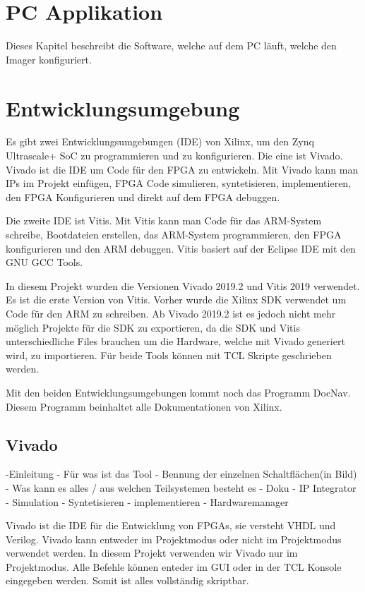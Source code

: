 \documentclass{article}
\begin{document}
\section{PC Applikation}
Dieses Kapitel beschreibt die Software, welche auf dem PC läuft, welche den Imager konfiguriert.

\section{Entwicklungsumgebung}
Es gibt zwei Entwicklungsumgebungen (IDE) von Xilinx, um den Zynq Ultrascale+ SoC zu programmieren und zu konfigurieren. Die eine ist Vivado. Vivado ist die IDE um Code für den FPGA zu entwickeln. Mit Vivado kann man IPs im Projekt einfügen, FPGA Code simulieren, syntetisieren, implementieren, den FPGA Konfigurieren und direkt auf dem FPGA debuggen.

Die zweite IDE ist Vitis. Mit Vitis kann man Code für das ARM-System schreibe, Bootdateien erstellen, das ARM-System programmieren, den FPGA konfigurieren und den ARM debuggen. Vitis basiert auf der Eclipse IDE mit den GNU GCC Tools.

In diesem Projekt wurden die Versionen Vivado 2019.2 und Vitis 2019 verwendet. Es ist die erste Version von Vitis. Vorher wurde die Xilinx SDK verwendet um Code für den ARM zu schreiben. Ab Vivado 2019.2 ist es jedoch nicht mehr möglich Projekte für die SDK zu exportieren, da die SDK und Vitis unterschiedliche Files brauchen um die Hardware, welche mit Vivado generiert wird, zu importieren. Für beide Tools können mit TCL Skripte geschrieben werden.

Mit den beiden Entwicklungsumgebungen kommt noch das Programm DocNav. Diesem Programm beinhaltet alle Dokumentationen von Xilinx.
\subsection{Vivado}
-Einleitung
    - Für was ist das Tool
    - Bennung der einzelnen Schaltflächen(in Bild)
    - Was kann es alles / aus welchen Teilsystemen besteht es
    - Doku
- IP Integrator
- Simulation
- Syntetisieren
- implementieren
- Hardwaremanager

Vivado ist die IDE für die Entwicklung von FPGAs, sie versteht VHDL und Verilog. Vivado kann entweder im Projektmodus oder nicht im Projektmodus verwendet werden. In diesem Projekt verwenden wir Vivado nur im Projektmodus. Alle Befehle können enteder im GUI oder in der TCL Konsole eingegeben werden. Somit ist alles vollständig skriptbar. 
\end{document}
